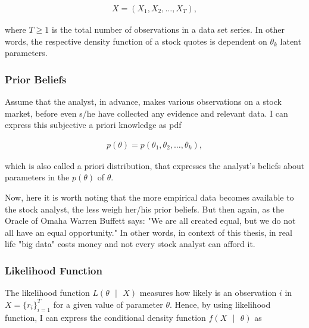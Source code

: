 \documentclass[a4paper,11pt,english]{article}
\begin{document}
		\begin{eqnarray*}
			X=(X_1, X_2,\ldots, X_T),		
		\end{eqnarray*}
		
		\noindent where $T \geq 1$ is the total number of observations in a data set series. In other words, the respective density function of a stock 
		quotes is dependent on $\theta_k$ latent parameters. 

			\subsubsection{Prior Beliefs}
	
			Assume that the analyst, in advance, makes various observations on a stock market, before even s/he have collected any evidence and relevant 
			data. I can express this subjective a priori knowledge as pdf
			
			\begin{eqnarray*}
				p(\theta) = p(\theta_1, \theta_2, \ldots, \theta_k),		
			\end{eqnarray*}
			
			\noindent which is also called a priori distribution, that expresses the analyst's beliefs about parameters in the $p(\theta)$ of $\theta$.
	
			Now, here it is worth noting that the more empirical data becomes available to the stock analyst, the less weigh her/his prior beliefs. But 
			then again, as the Oracle of Omaha Warren Buffett says: "We are all created equal, but we do not all have an equal opportunity." In other 
			words, in context of this thesis, in real life "big data" costs money and not every stock analyst can afford it. 				

			
			\subsubsection{Likelihood Function}
   
			The likelihood function $L(\theta \text{ } | \text{ }X)$ measures how likely is an observation $i$ in $X =\{r_i\}_{i=1}^T$ for a given value 
			of parameter $\theta$. Hence, by using likelihood function, I can express the conditional density function $f(X\text{ }|\text{ }\theta)$ as
			
\end{document}
